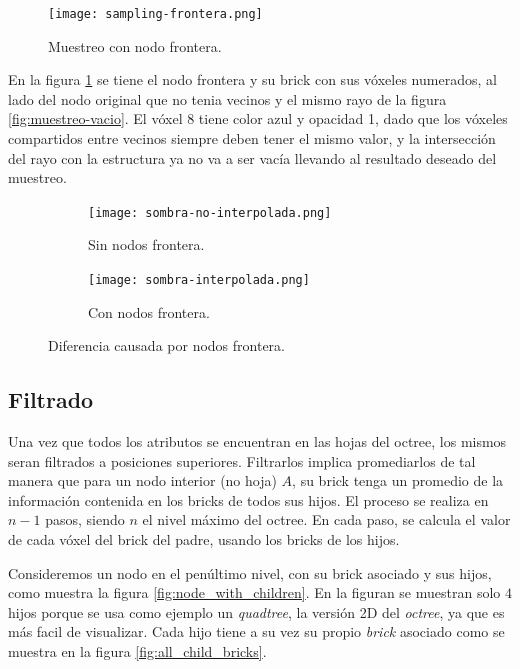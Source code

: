 \begin{figure}[h!]
    \centering
    \texttt{[image: sampling-frontera.png]}
    \caption{Muestreo con nodo frontera.}
    \label{fig:muestreo-frontera}
\end{figure}

En la figura \ref{fig:muestreo-frontera} se tiene el nodo frontera y su brick con sus vóxeles numerados, al lado del nodo original que no tenia vecinos y el mismo rayo de la figura \ref{fig:muestreo-vacio}.
El vóxel 8 tiene color azul y opacidad 1, dado que los vóxeles compartidos entre vecinos siempre deben tener el mismo valor, y la intersección del rayo con la estructura ya no va a ser vacía llevando al resultado deseado del muestreo.

\begin{figure}
    \begin{subfigure}{.49\textwidth}
        \centering
        \texttt{[image: sombra-no-interpolada.png]}
        \caption{Sin nodos frontera.}
    \end{subfigure}
    \begin{subfigure}{.49\textwidth}
        \centering
        \texttt{[image: sombra-interpolada.png]}
        \caption{Con nodos frontera.}
    \end{subfigure}
    \caption{Diferencia causada por nodos frontera.}
    \label{fig:nodos_frontera}
\end{figure}

\subsection{Filtrado}\label{design:filtering}

Una vez que todos los atributos se encuentran en las hojas del octree, los mismos seran filtrados a posiciones superiores.
Filtrarlos implica promediarlos de tal manera que para un nodo interior (no hoja) $A$, su brick tenga un promedio de la información contenida en los bricks de todos sus hijos.
El proceso se realiza en $n - 1$ pasos, siendo $n$ el nivel máximo del octree.
En cada paso, se calcula el valor de cada vóxel del brick del padre, usando los bricks de los hijos.

Consideremos un nodo en el penúltimo nivel, con su brick asociado y sus hijos, como muestra la figura \ref{fig:node_with_children}.
En la figuran se muestran solo $4$ hijos porque se usa como ejemplo un \textit{quadtree}, la versión 2D del \textit{octree}, ya que es más facil de visualizar.
Cada hijo tiene a su vez su propio \textit{brick} asociado como se muestra en la figura \ref{fig:all_child_bricks}.

